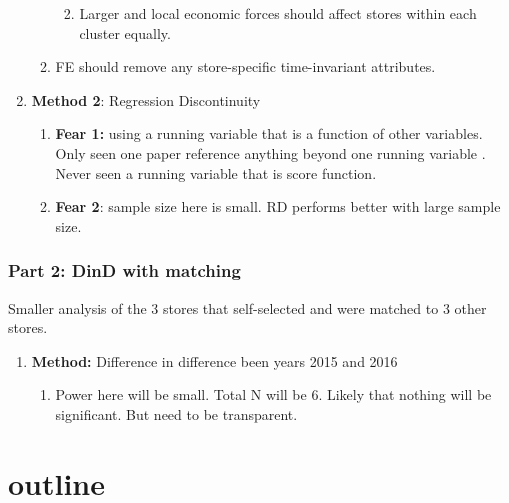 \documentclass[12pt,letterpaperpaper,]{book}
\providecommand{\tightlist}{%
  \setlength{\itemsep}{0pt}\setlength{\parskip}{0pt}}
\begin{document}
\begin{enumerate}
\begin{enumerate}
    \begin{enumerate}
    \def\labelenumiii{\arabic{enumiii}.}
    \setcounter{enumiii}{5}
    \tightlist
    \item
      Larger and local economic forces should affect stores within each
      cluster equally.
    \end{enumerate}
  \item
    FE should remove any store-specific time-invariant attributes.
  \end{enumerate}
\item
  \textbf{Method 2}: Regression Discontinuity

  \begin{enumerate}
  \def\labelenumii{\arabic{enumii}.}
  \setcounter{enumii}{3}
  \tightlist
  \item
    \textbf{Fear 1:} using a running variable that is a function of
    other variables. Only seen one paper reference anything beyond one
    running variable \citep{papay_extending_2011}. Never seen a running
    variable that is score function.
  \item
    \textbf{Fear 2}: sample size here is small. RD performs better with
    large sample size.
  \end{enumerate}
\end{enumerate}

\subsection*{Part 2: DinD with
matching}\label{part-2-dind-with-matching}

Smaller analysis of the 3 stores that self-selected and were matched to
3 other stores.

\begin{enumerate}
\def\labelenumi{\arabic{enumi}.}
\setcounter{enumi}{2}
\tightlist
\item
  \textbf{Method:} Difference in difference been years 2015 and 2016

  \begin{enumerate}
  \def\labelenumii{\arabic{enumii}.}
  \setcounter{enumii}{2}
  \tightlist
  \item
    Power here will be small. Total N will be 6. Likely that nothing
    will be significant. But need to be transparent.
  \end{enumerate}
\end{enumerate}

\chapter{outline}\label{outline}
\end{document}
